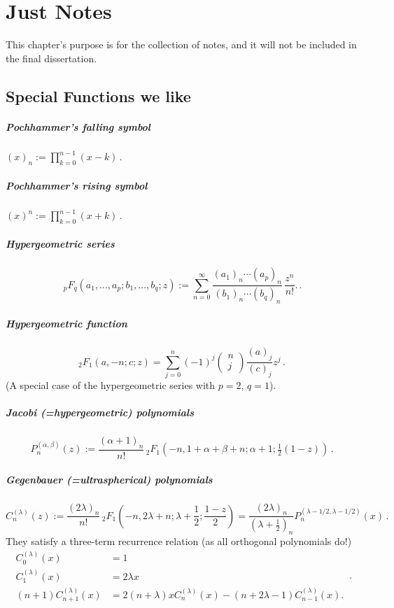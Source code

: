 \chapter*{Just Notes}
This chapter's purpose is for the collection of notes, and it will not be included in the final dissertation.

\section*{Special Functions we like}

\paragraph{Pochhammer's falling symbol} $(x)_n := \prod_{k=0}^{n-1} (x-k)\,.$
\paragraph{Pochhammer's rising symbol} $(x)^n := \prod_{k=0}^{n-1} (x+k)\,.$

\paragraph{Hypergeometric series}
$${ \,{}_{p}F_{q}(a_{1},\ldots ,a_{p};b_{1},\ldots ,b_{q};z) := \sum _{n=0}^{\infty }{\frac {(a_{1})_{n}\cdots (a_{p})_{n}}{(b_{1})_{n}\cdots (b_{q})_{n}}}\,{\frac {z^{n}}{n!}}.}\,.$$

\paragraph{Hypergeometric function}
$${}_2 F_1(a,-n;c;z) = \sum_{j=0}^n (-1)^j \begin{pmatrix}n \\j\end{pmatrix} \frac{(a)_j}{(c)_j}z^j\,.$$
(A special case of the hypergeometric series with $p=2$, $q=1$).

\paragraph{Jacobi (=hypergeometric) polynomials}
$$P_{n}^{{(\alpha ,\beta )}}(z) := {\frac{(\alpha +1)_{n}}{n!}}\,{}_{2}F_{1}\left(-n,1+\alpha +\beta +n;\alpha +1;{\tfrac  {1}{2}}(1-z)\right)\,.$$

\paragraph{Gegenbauer (=ultraspherical) polynomials}
$$C_{n}^{{( \lambda )}}(z) := {\frac  {(2\lambda )_{n}}{n!}}\,_{2}F_{1}\left(-n,2\lambda +n;\lambda +{\frac  {1}{2}};{\frac  {1-z}{2}}\right) = {\frac  {(2\lambda )_{n}}{(\lambda +{\frac  {1}{2}})_{{n}}}}P_{n}^{{(\lambda -1/2,\lambda -1/2)}}(x)\,.$$
They satisfy a three-term recurrence relation (as all orthogonal polynomials do!)
$${ {\begin{aligned}C_{0}^{(\lambda )}(x)&=1\\C_{1}^{(\lambda )}(x)&=2\lambda x\\(n+1)C_{n+1}^{(\lambda )}(x)&=2(n+\lambda )xC_{n}^{(\lambda )}(x)-(n+2\lambda -1)C_{n-1}^{(\lambda )}(x).\end{aligned}}}\,.$$

